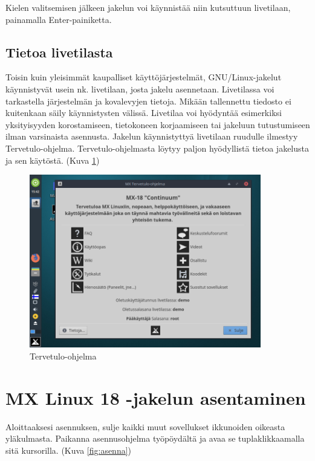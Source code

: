 \documentclass[a4paper, 12pt, finnish]{article}
\begin{document}
Kielen valitsemisen jälkeen jakelun voi käynnistää niin kutsuttuun livetilaan, painamalla Enter-painiketta.

\subsection{Tietoa livetilasta}

Toisin kuin yleisimmät kaupalliset käyttöjärjestelmät, GNU/Linux-jakelut käynnistyvät usein nk. livetilaan, josta jakelu asennetaan.
Livetilassa voi tarkastella järjestelmän ja kovalevyjen tietoja. Mikään tallennettu tiedosto ei kuitenkaan säily käynnistysten välissä. Livetilaa voi hyödyntää esimerkiksi yksityisyyden korostamiseen, tietokoneen korjaamiseen tai jakeluun tutustumiseen ilman varsinaista asennusta. Jakelun käynnistyttyä livetilaan ruudulle ilmestyy Tervetulo-ohjelma.
Tervetulo-ohjelmasta löytyy paljon hyödyllistä tietoa jakelusta ja sen käytöstä. (Kuva \ref{fig:welcome})

\begin{figure}[htpb]
    \begin{center}
        \includegraphics[width=0.9\textwidth]{asen/welcome}
        \caption{Tervetulo-ohjelma}
        \label{fig:welcome}
    \end{center}
\end{figure}

\section{MX Linux 18 -jakelun asentaminen}

Aloittaaksesi asennuksen, sulje kaikki muut sovellukset ikkunoiden oikeasta yläkulmasta. Paikanna asennusohjelma työpöydältä ja avaa se tuplaklikkaamalla sitä kursorilla. (Kuva \ref{fig:asenna})
\end{document}

